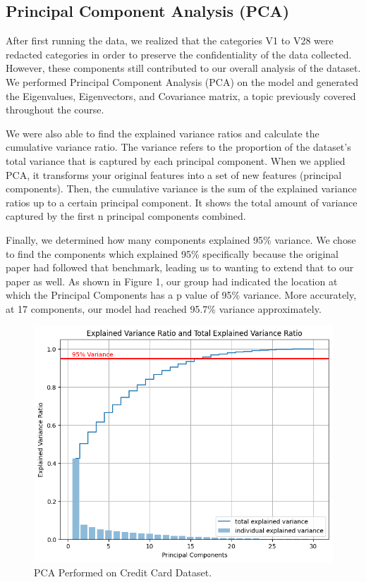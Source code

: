 \documentclass{article}
\begin{document}
\subsection{Principal Component Analysis (PCA)}
After first running the data, we realized that the categories V1 to V28 were redacted categories in order to preserve the confidentiality of the data collected. However, these components still contributed to our overall analysis of the dataset. We performed Principal Component Analysis (PCA) on the model and generated the Eigenvalues, Eigenvectors, and Covariance matrix, a topic previously covered throughout the course. 

We were also able to find the explained variance ratios and calculate the cumulative variance ratio. The variance refers to the proportion of the dataset's total variance that is captured by each principal component. When we applied PCA, it transforms your original features into a set of new features (principal components). Then, the cumulative variance is the sum of the explained variance ratios up to a certain principal component. It shows the total amount of variance captured by the first n principal components combined. 

Finally, we determined how many components explained 95\% variance. We chose to find the components which explained 95\% specifically because the original paper had followed that benchmark, leading us to wanting to extend that to our paper as well. As shown in Figure 1, our group had indicated the location at which the Principal Components has a p value of 95\% variance. More accurately, at 17 components, our model had reached 95.7\% variance approximately.

\begin{figure}[H]
    \centering
    \includegraphics[width=.75\textwidth]{pca on credit card fraud data.png} 
    \caption{PCA Performed on Credit Card Dataset.}
    \label{fig:pca}
\end{figure}
\end{document}
